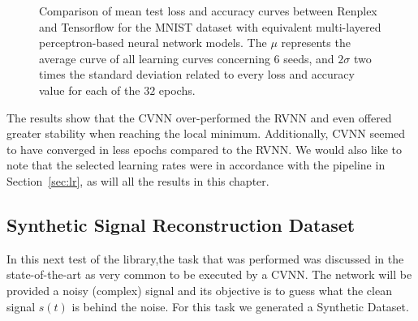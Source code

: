 \begin{figure}[htbp]
	\centering
	\caption{Comparison of mean test loss and accuracy curves between Renplex and Tensorflow for the MNIST dataset with equivalent multi-layered perceptron-based neural network models. The $ \mu $ represents the average curve of all learning curves concerning 6 seeds, and $ 2\sigma $ two times the standard deviation related to every loss and accuracy value for each of the $ 32 $ epochs.}
	\label{fig:comp_dense_mnist}
\end{figure}

The results show that the \gls{CVNN} over-performed the \gls{RVNN} and even offered greater stability when reaching the local minimum. Additionally, CVNN seemed to have converged in less epochs compared to the RVNN. We would also like to note that the selected learning rates were in accordance with the pipeline in Section~\ref{sec:lr}, as will all the results in this chapter.

\subsection{Synthetic Signal Reconstruction Dataset}
In this next test of the library,the task that was performed was discussed in the state-of-the-art as very common to be executed by a \gls{CVNN}. The network will be provided a noisy (complex) signal and its objective is to guess what the clean signal $ s(t) $ is behind the noise. For this task we generated a Synthetic Dataset.

